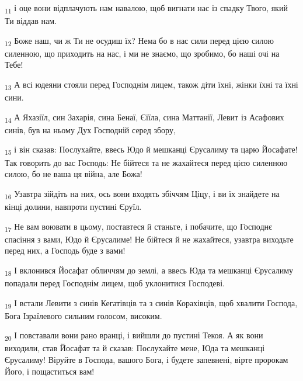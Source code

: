 \begin{tcolorbox}
\textsubscript{11} і оце вони відплачують нам навалою, щоб вигнати нас із спадку Твого, який Ти віддав нам.
\end{tcolorbox}
\begin{tcolorbox}
\textsubscript{12} Боже наш, чи ж Ти не осудиш їх? Нема бо в нас сили перед цією силою силенною, що приходить на нас, і ми не знаємо, що зробимо, бо наші очі на Тебе!
\end{tcolorbox}
\begin{tcolorbox}
\textsubscript{13} А всі юдеяни стояли перед Господнім лицем, також діти їхні, жінки їхні та їхні сини.
\end{tcolorbox}
\begin{tcolorbox}
\textsubscript{14} А Яхазіїл, син Захарія, сина Бенаї, Єіїла, сина Маттанії, Левит із Асафових синів, був на ньому Дух Господній серед збору,
\end{tcolorbox}
\begin{tcolorbox}
\textsubscript{15} і він сказав: Послухайте, ввесь Юдо й мешканці Єрусалиму та царю Йосафате! Так говорить до вас Господь: Не бійтеся та не жахайтеся перед цією силенною силою, бо не ваша ця війна, але Божа!
\end{tcolorbox}
\begin{tcolorbox}
\textsubscript{16} Узавтра зійдіть на них, ось вони входять збіччям Ціцу, і ви їх знайдете на кінці долини, навпроти пустині Єруїл.
\end{tcolorbox}
\begin{tcolorbox}
\textsubscript{17} Не вам воювати в цьому, поставтеся й станьте, і побачите, що Господнє спасіння з вами, Юдо й Єрусалиме! Не бійтеся й не жахайтеся, узавтра виходьте перед них, а Господь буде з вами!
\end{tcolorbox}
\begin{tcolorbox}
\textsubscript{18} І вклонився Йосафат обличчям до землі, а ввесь Юда та мешканці Єрусалиму попадали перед Господнім лицем, щоб уклонитися Господеві.
\end{tcolorbox}
\begin{tcolorbox}
\textsubscript{19} І встали Левити з синів Кегатівців та з синів Корахівців, щоб хвалити Господа, Бога Ізраїлевого сильним голосом, високим.
\end{tcolorbox}
\begin{tcolorbox}
\textsubscript{20} І повставали вони рано вранці, і вийшли до пустині Текоя. А як вони виходили, став Йосафат та й сказав: Послухайте мене, Юда та мешканці Єрусалиму! Віруйте в Господа, вашого Бога, і будете запевнені, вірте пророкам Його, і пощаститься вам!
\end{tcolorbox}
